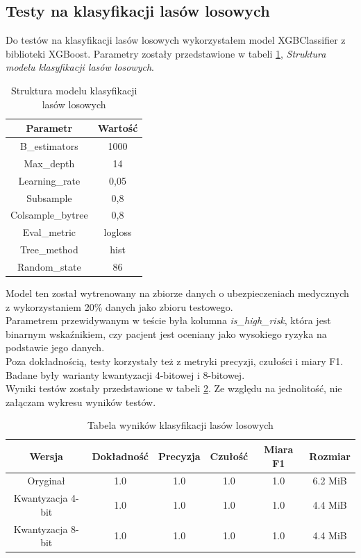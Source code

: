 \subsection{Testy na klasyfikacji lasów losowych}
Do testów na klasyfikacji lasów losowych wykorzystałem model XGBClassifier z biblioteki XGBoost. Parametry zostały przedstawione w tabeli \ref{tab:random_forest_model_structure}, \textit{Struktura modelu klasyfikacji lasów losowych}. \\
\begin{table}[htbp]
    \centering
    \caption{Struktura modelu klasyfikacji lasów losowych}
    \label{tab:random_forest_model_structure}
    \begin{tabular}{|c|c|}
        \hline
        \textbf{Parametr} & \textbf{Wartość} \\
        \hline
        B\_estimators & 1000 \\
        \hline
        Max\_depth & 14 \\
        \hline
        Learning\_rate & 0,05 \\
        \hline
        Subsample & 0,8 \\
        \hline
        Colsample\_bytree & 0,8 \\
        \hline
        Eval\_metric & logloss \\
        \hline
        Tree\_method & hist \\
        \hline
        Random\_state & 86 \\
        \hline
    \end{tabular}
\end{table}
Model ten został wytrenowany na zbiorze danych o ubezpieczeniach medycznych z wykorzystaniem 20\% danych jako zbioru testowego. \\
Parametrem przewidywanym w teście była kolumna \textit{is\_high\_risk}, która jest binarnym wskaźnikiem, czy pacjent jest oceniany jako wysokiego ryzyka na podstawie jego danych. \\
Poza dokładnością, testy korzystały też z metryki precyzji, czułości i miary F1.
Badane były warianty kwantyzacji 4-bitowej i 8-bitowej. \\
Wyniki testów zostały przedstawione w tabeli \ref{tab:random_forest_results}. Ze względu na jednolitość, nie załączam wykresu wyników testów.
\begin{table}
    \centering
    \caption{Tabela wyników klasyfikacji lasów losowych}
    \label{tab:random_forest_results}
    \begin{tabular}{|c|c|c|c|c|c|}
        \hline
        \textbf{Wersja} & \textbf{Dokładność} & \textbf{Precyzja} & \textbf{Czułość} & \textbf{Miara F1} & \textbf{Rozmiar} \\ 
        \hline
        Oryginał & 1.0 & 1.0 & 1.0 & 1.0 & 6.2 MiB \\
        \hline
        Kwantyzacja 4-bit & 1.0 & 1.0 & 1.0 & 1.0 & 4.4 MiB \\
        \hline
        Kwantyzacja 8-bit & 1.0 & 1.0 & 1.0 & 1.0 & 4.4 MiB \\
        \hline
    \end{tabular}
\end{table}

